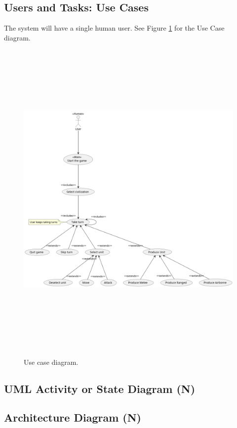 \documentclass[11pt]{amsart}
\begin{document}
\subsection*{Users and Tasks: Use Cases} \phantom{}
The system will have a single human user. See Figure \ref{fig:use_cases} for the Use Case diagram.
\begin{figure}[h!]
    \begin{center}
    \includegraphics[height=160mm]{../diagrams/use_cases/use_cases.png} \\
    \caption{Use case diagram.}
    \label{fig:use_cases}
    \end{center}
\end{figure}

\newpage
\subsection*{UML Activity or State Diagram (N)} \phantom{}
\subsection*{Architecture Diagram (N)} \phantom{}
\end{document}
